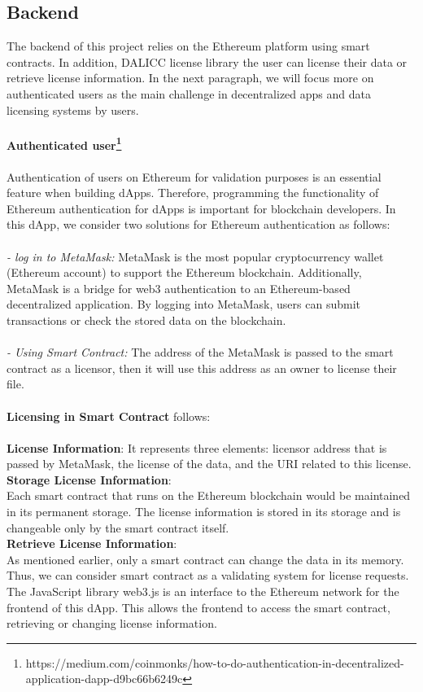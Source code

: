 \subsection{Backend} The backend of this project relies on the Ethereum platform using smart contracts. In addition, DALICC license library the user can license their data or retrieve license information. In the next paragraph, we will focus more on authenticated users as the main challenge in decentralized apps and data licensing systems by users.\\
\\
\textbf{Authenticated user\footnote{https://medium.com/coinmonks/how-to-do-authentication-in-decentralized-application-dapp-d9bc66b6249c}} \\
\\
Authentication of users on Ethereum for validation purposes is an essential feature when building dApps. Therefore, programming the functionality of Ethereum authentication for dApps is important for blockchain developers. 
In this dApp, we consider two solutions for Ethereum authentication as follows: \\
\\
\textit{- log in to MetaMask:} MetaMask is the most popular cryptocurrency wallet (Ethereum account) to support the Ethereum blockchain. Additionally, MetaMask is a bridge for web3 authentication to an Ethereum-based decentralized application. By logging into MetaMask, users can submit transactions or check the stored data on the blockchain.\\
\\
\textit{- Using Smart Contract:} The address of the MetaMask is passed to the smart contract as a licensor, then it will use this address as an owner to license their file. \\
\\
\textbf{Licensing in Smart Contract} follows: \\
\\
\textbf{License Information}: It represents three elements: licensor address that is passed by MetaMask, the license of the data, and the URI related to this license.\\
\textbf{Storage License Information}: \\Each smart contract that runs on the Ethereum blockchain would be maintained in its permanent storage. The license information is stored in its storage and is changeable only by the smart contract itself.\\
\textbf{Retrieve License Information}: \\As mentioned earlier, only a smart contract can change the data in its memory. Thus, we can consider smart contract as a validating system for license requests. The JavaScript library web3.js is an interface to the Ethereum network for the frontend of this dApp. This allows the frontend to access the smart contract, retrieving or changing license information.\\
